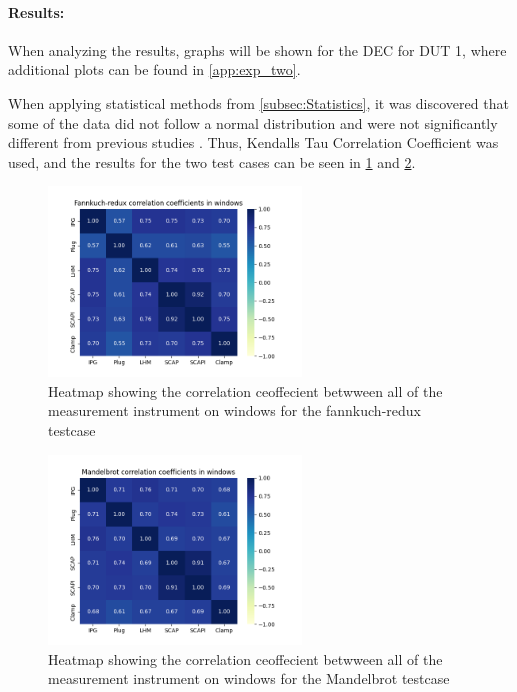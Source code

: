 

\paragraph{Results:} When analyzing the results, graphs will be shown for the DEC for DUT 1, where additional plots can be found in \cref{app:exp_two}.




When applying statistical methods from \cref{subsec:Statistics}, it was discovered that some of the data did not follow a normal distribution and were not significantly different from previous studies \cite{biksbois, Koedijk2022diff}. Thus, Kendalls Tau Correlation Coefficient was used, and the results for the two test cases can be seen in \cref{fig:fannkuchCorr} and \cref{fig:mandelbrotCorr}.

\begin{figure}[H]
    \centering
    \includegraphics[width=0.6\textwidth]{figures/Fannkuch-redux_ex2.png}
    \caption{Heatmap showing the correlation ceoffecient betwween all of the measurement instrument on windows for the fannkuch-redux testcase}
    \label{fig:fannkuchCorr}
  \end{figure}
  
  \begin{figure}[H]
    \centering
    \includegraphics[width=0.6\textwidth]{figures/Mandelbrot_ex2.png}
    \caption{Heatmap showing the correlation ceoffecient betwween all of the measurement instrument on windows for the Mandelbrot testcase }
    \label{fig:mandelbrotCorr}
  \end{figure}

